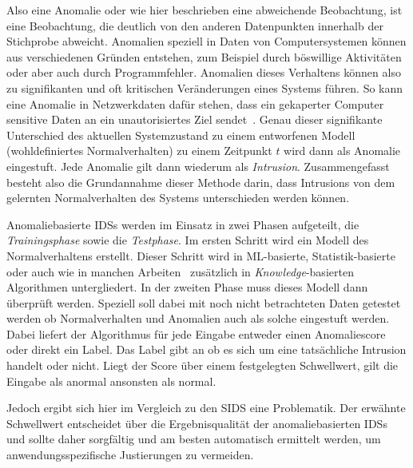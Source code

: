                 Also eine Anomalie oder wie hier beschrieben eine abweichende Beobachtung, ist eine Beobachtung, die deutlich von den anderen Datenpunkten innerhalb der Stichprobe abweicht.
                Anomalien speziell in Daten von Computersystemen können aus verschiedenen Gründen entstehen, zum Beispiel durch böswillige Aktivitäten oder aber auch durch Programmfehler.
                Anomalien dieses Verhaltens können also zu signifikanten und oft kritischen Veränderungen eines Systems führen.
                So kann eine Anomalie in Netzwerkdaten dafür stehen, dass ein gekaperter Computer sensitive Daten an ein unautorisiertes Ziel sendet~\cite{ANOMALYEXAMPLE}.
                Genau dieser signifikante Unterschied des aktuellen Systemzustand zu einem entworfenen Modell (wohldefiniertes Normalverhalten) zu einem Zeitpunkt $t$ wird dann als Anomalie eingestuft.
                Jede Anomalie gilt dann wiederum als \textit{Intrusion}.
                Zusammengefasst besteht also die Grundannahme dieser Methode darin, dass Intrusions von dem gelernten Normalverhalten des Systems unterschieden werden können.


                Anomaliebasierte \acp{IDS} werden im Einsatz in zwei Phasen aufgeteilt, die \textit{Trainingsphase} sowie die \textit{Testphase}.
                Im ersten Schritt wird ein Modell des Normalverhaltens erstellt.
                Dieser Schritt wird in \ac{ML}-basierte, Statistik-basierte~\cite{IDSPIETRO2008} oder auch 
                wie in manchen Arbeiten~\cite{IDSsurvey} zusätzlich in \textit{Knowledge}-basierten  Algorithmen untergliedert.
                In der zweiten Phase muss dieses Modell dann überprüft werden.
                Speziell soll dabei mit noch nicht betrachteten Daten getestet werden ob Normalverhalten und Anomalien auch als solche eingestuft werden.
                Dabei liefert der Algorithmus für jede Eingabe entweder einen Anomaliescore oder direkt ein Label.
                Das Label gibt an ob es sich um eine tatsächliche Intrusion handelt oder nicht.
                Liegt der Score über einem festgelegten Schwellwert, gilt die Eingabe als anormal ansonsten als normal.~\cite{IDSPIETRO2008}

                Jedoch ergibt sich hier im Vergleich zu den \ac{SIDS} eine Problematik.
                Der erwähnte Schwellwert entscheidet über die Ergebnisqualität der anomaliebasierten \acp{IDS} und sollte daher sorgfältig und am besten automatisch ermittelt werden, um anwendungsspezifische Justierungen zu vermeiden.

